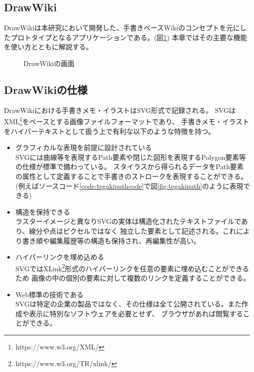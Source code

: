 \subsection{DrawWiki}
DrawWikiは本研究において開発した、手書きベースWikiのコンセプトを元にしたプロトタイプとなるアプリケーションである。(図\ref{drawwiki})
本章ではその主要な機能を使い方とともに解説する。

\begin{figure}[htbp]
    \begin{center}
         \end{center}
    \caption{DrawWikiの画面}
    \label{drawwiki}
\end{figure}

\subsection{DrawWikiの仕様}
DrawWikiにおける手書きメモ・イラストはSVG\cite{aboutsvg}形式で記録される。
SVGはXML\footnote{https://www.w3.org/XML/}をベースとする画像ファイルフォーマットであり、
手書きメモ・イラストをハイパーテキストとして扱う上で有利な以下のような特徴を持つ。
\begin{itemize}
    \item グラフィカルな表現を前提に設計されている\\
    SVGには曲線等を表現するPath要素や閉じた図形を表現するPolygon要素等の仕様が標準で備わっている。
    スタイラスから得られるデータをPath要素の属性として定義することで手書きのストロークを表現することができる。
    (例えばソースコード\ref{code:tegakipathcode}で図\ref{fig:tegakipath}のように表現できる)
    \item 構造を保持できる\\
    ラスターイメージと異なりSVGの実体は構造化されたテキストファイルであり、線分や点はピクセルではなく
    独立した要素として記述される。これにより書き順や編集履歴等の構造も保持され、再編集性が高い。
    \item ハイパーリンクを埋め込める\\
    SVGではXLink\footnote{https://www.w3.org/TR/xlink/}形式のハイパーリンクを任意の要素に埋め込むことができるため
    画像の中の個別の要素に対して複数のリンクを定義することができる。
    \item Web標準の技術である\\
    SVGは特定の企業の製品ではなく、その仕様は全て公開されている。また作成や表示に特別なソフトウェアを必要とせず、
    ブラウザがあれば閲覧することができる。
\end{itemize}

